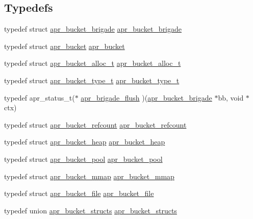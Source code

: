 \subsection*{Typedefs}
\begin{DoxyCompactItemize}
\item 
typedef struct \hyperlink{structapr__bucket__brigade}{apr\-\_\-bucket\-\_\-brigade} \hyperlink{group___a_p_r___util___bucket___brigades_ga9f50254e85c7aad79ca289a0ba069025}{apr\-\_\-bucket\-\_\-brigade}
\item 
typedef struct \hyperlink{structapr__bucket}{apr\-\_\-bucket} \hyperlink{group___a_p_r___util___bucket___brigades_gaa17a456120961b1c5af0525f4900a457}{apr\-\_\-bucket}
\item 
typedef struct \hyperlink{group___a_p_r___util___bucket___brigades_ga9a30babfeb6e290db124d8f9b69e49e4}{apr\-\_\-bucket\-\_\-alloc\-\_\-t} \hyperlink{group___a_p_r___util___bucket___brigades_ga9a30babfeb6e290db124d8f9b69e49e4}{apr\-\_\-bucket\-\_\-alloc\-\_\-t}
\item 
typedef struct \hyperlink{structapr__bucket__type__t}{apr\-\_\-bucket\-\_\-type\-\_\-t} \hyperlink{group___a_p_r___util___bucket___brigades_ga4a152aaf7d851c81af73b7e84dc1a8a2}{apr\-\_\-bucket\-\_\-type\-\_\-t}
\item 
typedef apr\-\_\-status\-\_\-t($\ast$ \hyperlink{group___a_p_r___util___bucket___brigades_gacdf6dc9d4c81c64834e5e509281f7f16}{apr\-\_\-brigade\-\_\-flush} )(\hyperlink{structapr__bucket__brigade}{apr\-\_\-bucket\-\_\-brigade} $\ast$bb, void $\ast$ctx)
\item 
typedef struct \hyperlink{structapr__bucket__refcount}{apr\-\_\-bucket\-\_\-refcount} \hyperlink{group___a_p_r___util___bucket___brigades_ga785fd3402961b30315975b0c87c87706}{apr\-\_\-bucket\-\_\-refcount}
\item 
typedef struct \hyperlink{structapr__bucket__heap}{apr\-\_\-bucket\-\_\-heap} \hyperlink{group___a_p_r___util___bucket___brigades_gaede6e77d621d0f3f7d2685d489d01283}{apr\-\_\-bucket\-\_\-heap}
\item 
typedef struct \hyperlink{structapr__bucket__pool}{apr\-\_\-bucket\-\_\-pool} \hyperlink{group___a_p_r___util___bucket___brigades_ga211e00d871029de148116cd24b070aed}{apr\-\_\-bucket\-\_\-pool}
\item 
typedef struct \hyperlink{structapr__bucket__mmap}{apr\-\_\-bucket\-\_\-mmap} \hyperlink{group___a_p_r___util___bucket___brigades_ga27ede7c3a29627c7d184dc7cfbc4f767}{apr\-\_\-bucket\-\_\-mmap}
\item 
typedef struct \hyperlink{structapr__bucket__file}{apr\-\_\-bucket\-\_\-file} \hyperlink{group___a_p_r___util___bucket___brigades_ga1a786f7edac4d7a2c212f0fe74457b3d}{apr\-\_\-bucket\-\_\-file}
\item 
typedef union \hyperlink{unionapr__bucket__structs}{apr\-\_\-bucket\-\_\-structs} \hyperlink{group___a_p_r___util___bucket___brigades_ga3c0929c971f94de4521fb0fea6fd3209}{apr\-\_\-bucket\-\_\-structs}
\end{DoxyCompactItemize}
